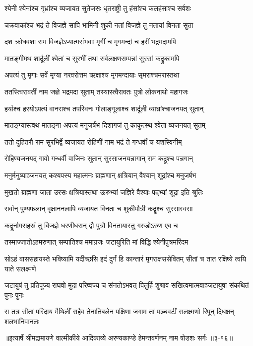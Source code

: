 \twolineshloka
{श्येनी श्येनांश्च गृध्रांश्च व्यजायत सुतेजसः}
{धृतराष्ट्री तु हंसांश्च कलहंसाश्च सर्वशः} %

\twolineshloka
{चक्रवाकांश्च भद्रं ते विजज्ञे सापि भामिनी}
{शुकी नतां विजज्ञे तु नतायां विनता सुता} %

\twolineshloka
{दश क्रोधवशा राम विजज्ञेऽप्यात्मसंभवाः}
{मृगीं च मृगमन्दां च हरीं भद्रमदामपि} %

\twolineshloka
{मातङ्गीमथ शार्दूलीं श्वेतां च सुरभीं तथा}
{सर्वलक्षणसम्पन्नां सुरसां कद्रुकामपि} %

\twolineshloka
{अपत्यं तु मृगाः सर्वे मृग्या नरवरोत्तम}
{ऋक्षाश्च मृगमन्दायाः सृमराश्चमरास्तथा} %

\twolineshloka
{ततस्त्विरावतीं नाम जज्ञे भद्रमदा सुताम्}
{तस्यास्त्वैरावतः पुत्रो लोकनाथो महागजः} %

\twolineshloka
{हर्याश्च हरयोऽपत्यं वानराश्च तपस्विनः}
{गोलाङ्गूलाश्च शार्दूली व्याघ्रांश्चाजनयत् सुतान्} %

\twolineshloka
{मातङ्ग्यास्त्वथ मातङ्गा अपत्यं मनुजर्षभ}
{दिशागजं तु काकुत्स्थ श्वेता व्यजनयत् सुतम्} %

\twolineshloka
{ततो दुहितरौ राम सुरभिर्द्वे व्यजायत}
{रोहिणीं नाम भद्रं ते गन्धर्वीं च यशस्विनीम्} %

\twolineshloka
{रोहिण्यजनयद् गावो गन्धर्वी वाजिनः सुतान्}
{सुरसाजनयन्नागान् राम कद्रूश्च पन्नगान्} %

\twolineshloka
{मनुर्मनुष्याञ्जनयत् कश्यपस्य महात्मनः}
{ब्राह्मणान् क्षत्रियान् वैश्यान् शूद्रांश्च मनुजर्षभ} %

\twolineshloka
{मुखतो ब्राह्मणा जाता उरसः क्षत्रियास्तथा}
{ऊरुभ्यां जज्ञिरे वैश्याः पद्भ्यां शूद्रा इति श्रुतिः} %

\twolineshloka
{सर्वान् पुण्यफलान् वृक्षाननलापि व्यजायत}
{विनता च शुकीपौत्री कद्रूश्च सुरसास्वसा} %

\twolineshloka
{कद्रूर्नागसहस्रं तु विजज्ञे धरणीधरान्}
{द्वौ पुत्रौ विनतायास्तु गरुडोऽरुण एव च} %

\twolineshloka
{तस्माज्जातोऽहमरुणात् सम्पातिश्च ममाग्रजः}
{जटायुरिति मां विद्धि श्येनीपुत्रमरिंदम} %

\threelineshloka
{सोऽहं वाससहायस्ते भविष्यामि यदीच्छसि}
{इदं दुर्गं हि कान्तारं मृगराक्षससेवितम्}
{सीतां च तात रक्षिष्ये त्वयि याते सलक्ष्मणे} %

\twolineshloka
{जटायुषं तु प्रतिपूज्य राघवो मुदा परिष्वज्य च संनतोऽभवत्}
{पितुर्हि शुश्राव सखित्वमात्मवाञ्जटायुषा संकथितं पुनः पुनः} %

\twolineshloka
{स तत्र सीतां परिदाय मैथिलीं सहैव तेनातिबलेन पक्षिणा}
{जगाम तां पञ्चवटीं सलक्ष्मणो रिपून् दिधक्षन् शलभानिवानलः} %


॥इत्यार्षे श्रीमद्रामायणे वाल्मीकीये आदिकाव्ये अरण्यकाण्डे हेमन्तवर्णनम् नाम षोडशः सर्गः ॥३-१६॥
